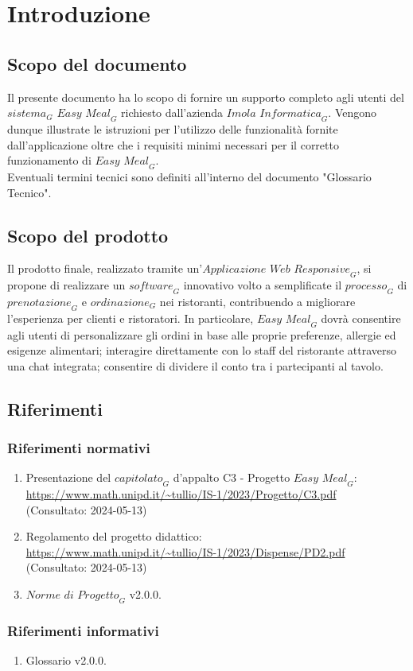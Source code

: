 \section{Introduzione}
\subsection{Scopo del documento}
Il presente documento ha lo scopo di fornire un supporto completo agli utenti del $\textit{sistema}_G$ $\textit{Easy Meal}_G$ richiesto dall'azienda $\textit{Imola Informatica}_G$. Vengono dunque illustrate le istruzioni per l'utilizzo delle funzionalità fornite dall'applicazione oltre che i requisiti minimi necessari per il corretto funzionamento di $\textit{Easy Meal}_G$.\\
Eventuali termini tecnici sono definiti all'interno del documento "Glossario Tecnico".

\subsection{Scopo del prodotto}
Il prodotto finale, realizzato tramite un'$\textit{Applicazione Web Responsive}_G$, si propone di realizzare un $\textit{software}_G$ innovativo volto a semplificate il $\textit{processo}_G$ di $\textit{prenotazione}_G$ e $\textit{ordinazione}_G$ nei ristoranti, contribuendo a migliorare l'esperienza per clienti e ristoratori. In particolare, $\textit{Easy Meal}_G$ dovrà consentire agli utenti di personalizzare gli ordini in base alle proprie preferenze, allergie ed esigenze alimentari; interagire direttamente con lo staff del ristorante attraverso una chat integrata; consentire di dividere il conto tra i partecipanti al tavolo.
\subsection{Riferimenti}
\subsubsection{Riferimenti normativi}
\begin{enumerate}
    \item Presentazione del $\textit{capitolato}_G$ d'appalto C3 - Progetto $\textit{Easy Meal}_G$: \\ \url{https://www.math.unipd.it/~tullio/IS-1/2023/Progetto/C3.pdf}\\
    (Consultato: 2024-05-13)
    \item Regolamento del progetto didattico: \\ \url{https://www.math.unipd.it/~tullio/IS-1/2023/Dispense/PD2.pdf}\\
    (Consultato: 2024-05-13)
    \item $\textit{Norme di Progetto}_G$ v2.0.0.
\end{enumerate}
\subsubsection{Riferimenti informativi}
\begin{enumerate}
    \item Glossario v2.0.0.
\end{enumerate}